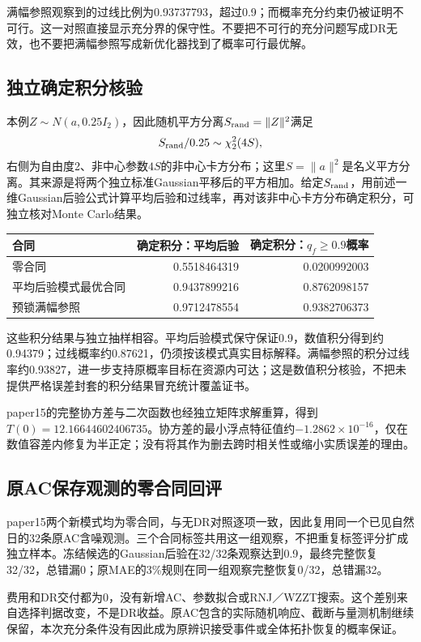 \documentclass[UTF8,11pt,a4paper,fontset=fandol]{ctexart}
\numberwithin{equation}{section}
\begin{document}
满幅参照观察到的过线比例为0.93737793，超过0.9；而概率充分约束仍被证明不可行。这一对照直接显示充分界的保守性。不要把不可行的充分问题写成DR无效，也不要把满幅参照写成新优化器找到了概率可行最优解。

\subsection{独立确定积分核验}
本例$Z\sim N(a,0.25I_2)$，因此随机平方分离$S_{\rm rand}=\|Z\|^2$满足
\begin{equation}
S_{\rm rand}/0.25\sim\chi^2_2(4S),
\end{equation}
右侧为自由度2、非中心参数$4S$的非中心卡方分布；这里$S=\|a\|^2$是名义平方分离。其来源是将两个独立标准Gaussian平移后的平方相加。给定$S_{\rm rand}$，用前述一维Gaussian后验公式计算平均后验和过线率，再对该非中心卡方分布确定积分，可独立核对Monte Carlo结果。

\begin{center}\small
\begin{tabular}{lrr}\toprule
合同&确定积分：平均后验&确定积分：$q_f\ge0.9$概率\\\midrule
零合同&0.5518464319&0.0200992003\\
平均后验模式最优合同&0.9437899216&0.8762098157\\
预锁满幅参照&0.9712478554&0.9382706373\\\bottomrule
\end{tabular}
\end{center}
这些积分结果与独立抽样相容。平均后验模式保守保证0.9，数值积分得到约0.94379；过线概率约0.87621，仍须按该模式真实目标解释。满幅参照的积分过线率约0.93827，进一步支持原概率目标在资源内可达；这是数值积分核验，不把未提供严格误差封套的积分结果冒充统计覆盖证书。

paper15的完整协方差与二次函数也经独立矩阵求解重算，得到$T(0)=12.16644602406735$。协方差的最小浮点特征值约$-1.2862\times10^{-16}$，仅在数值容差内修复为半正定；没有将其作为删去跨时相关性或缩小实质误差的理由。

\subsection{原AC保存观测的零合同回评}
paper15两个新模式均为零合同，与无DR对照逐项一致，因此复用同一个已见自然日的32条原AC含噪观测。三个合同标签共用这一组观察，不把重复标签评分扩成独立样本。冻结候选的Gaussian后验在32/32条观察达到0.9，最终完整恢复32/32，总错漏0；原MAE的3\%规则在同一组观察完整恢复0/32，总错漏32。

费用和DR交付都为0，没有新增AC、参数拟合或RNJ／WZZT搜索。这个差别来自选择判据改变，不是DR收益。原AC包含的实际随机响应、截断与量测机制继续保留，本次充分条件没有因此成为原辨识接受事件或全体拓扑恢复的概率保证。
\end{document}
